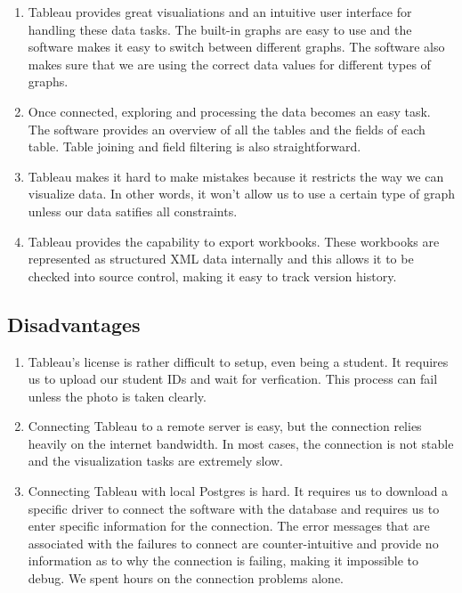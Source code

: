 \documentclass[10pt]{article}
\begin{document}
\begin{enumerate}

\item Tableau provides great visualiations and an intuitive user interface for handling these data tasks. The built-in graphs are easy to use and the software makes it easy to switch between different graphs. The software also makes sure that we are using the correct data values for different types of graphs.

\item Once connected, exploring and processing the data becomes an easy task. The software provides an overview of all the tables and the fields of each table. Table joining and field filtering is also straightforward.

\item Tableau makes it hard to make mistakes because it restricts the way we can visualize data. In other words, it won't allow us to use a certain type of graph unless our data satifies all constraints.

\item Tableau provides the capability to export workbooks. These workbooks are represented as structured XML data internally and this allows it to be checked into source control, making it easy to track version history.

\end{enumerate}

\subsection{Disadvantages}

\begin{enumerate}

\item Tableau's license is rather difficult to setup, even being a student. It requires us to upload our student IDs and wait for verfication. This process can fail unless the photo is taken clearly.

\item Connecting Tableau to a remote server is easy, but the connection relies heavily on the internet bandwidth. In most cases, the connection is not stable and the visualization tasks are extremely slow.

\item Connecting Tableau with local Postgres is hard. It requires us to download a specific driver to connect the software with the database and requires us to enter specific information for the connection. The error messages that are associated with the failures to connect are counter-intuitive and provide no information as to why the connection is failing, making it impossible to debug. We spent hours on the connection problems alone.

\end{enumerate}
\end{document}
